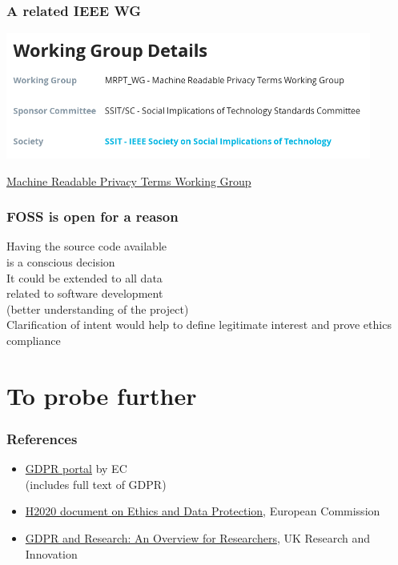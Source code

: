 \documentclass[17pt,aspectratio=169,hyperref={pdfusetitle,colorlinks,allcolors=olive}]{beamer}
\begin{document}
\begin{frame}[fragile]
  \frametitle{A related IEEE WG}

  \begin{center}
    \includegraphics[width=12cm]{figs/ieee-wg}
  \end{center}

  \begin{flushright}
    \href{https://standards.ieee.org/project/7012.html}{Machine Readable Privacy Terms Working Group}
  \end{flushright}
\end{frame}

\begin{frame}[fragile]
  \frametitle{FOSS is open for a reason}

  Having the source code available \\
  is a conscious decision\\
  \vspace{.3cm}
  It could be extended to all data \\
  related to software development \\
  (better understanding of the project) \\
  \vspace{.3cm}
  Clarification of intent would help to define legitimate interest and prove ethics compliance
\end{frame}



\section{To probe further}


\begin{frame}[fragile]
  \frametitle{References}

  \begin{itemize}
  \item \href{https://gdpr.eu/}{GDPR portal} by EC \\
    (includes full text of GDPR)
  \item \href{https://ec.europa.eu/research/participants/data/ref/h2020/grants_manual/hi/ethics/h2020_hi_ethics-data-protection_en.pdf}{H2020 document on Ethics and Data Protection}, European Commission
  \item \href{https://www.ukri.org/files/about/policy/ukri-gdpr-faqs-pdf}{GDPR and Research: An Overview for Researchers}, UK Research and Innovation
  \end{itemize}
  
\end{frame}
\end{document}
